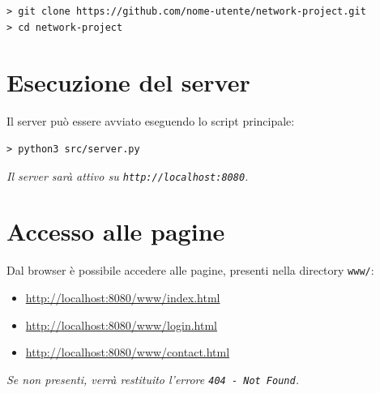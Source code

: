 \documentclass[a4paper,12pt]{report}
\begin{document}
\begin{verbatim}
> git clone https://github.com/nome-utente/network-project.git
> cd network-project
\end{verbatim}

\section{Esecuzione del server}
Il server può essere avviato eseguendo lo script principale:

\begin{verbatim}
> python3 src/server.py
\end{verbatim}

\noindent \textit{Il server sarà attivo su \texttt{http://localhost:8080}.}

\section{Accesso alle pagine}
Dal browser è possibile accedere alle pagine, presenti nella directory \texttt{www/}:

\begin{itemize}
    \item \url{http://localhost:8080/www/index.html}
    \item \url{http://localhost:8080/www/login.html}
    \item \url{http://localhost:8080/www/contact.html}
\end{itemize}

\noindent \textit{Se non presenti, verrà restituito l'errore \texttt{404 - Not Found}.}
\end{document}
